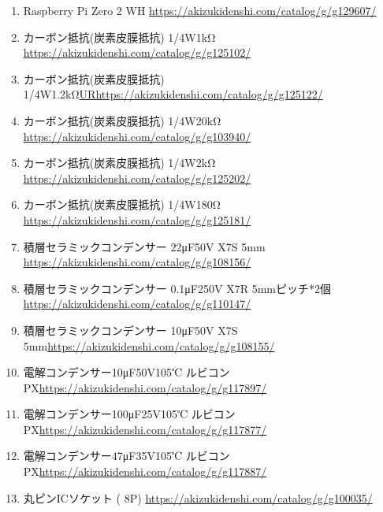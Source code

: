 \documentclass[a4paper,10pt]{jarticle}
\begin{document}
\begin{enumerate}
    \item Raspberry Pi Zero 2 WH \url{https://akizukidenshi.com/catalog/g/g129607/}
    \item カーボン抵抗(炭素皮膜抵抗) 1/4W1kΩ \url{https://akizukidenshi.com/catalog/g/g125102/}
    \item カーボン抵抗(炭素皮膜抵抗) 1/4W1.2kΩ\url{URhttps://akizukidenshi.com/catalog/g/g125122/}
    \item カーボン抵抗(炭素皮膜抵抗) 1/4W20kΩ \url{https://akizukidenshi.com/catalog/g/g103940/}
    \item カーボン抵抗(炭素皮膜抵抗) 1/4W2kΩ \url{https://akizukidenshi.com/catalog/g/g125202/}
    \item カーボン抵抗(炭素皮膜抵抗) 1/4W180Ω \url{https://akizukidenshi.com/catalog/g/g125181/}
    \item 積層セラミックコンデンサー 22μF50V X7S 5mm \url{https://akizukidenshi.com/catalog/g/g108156/}
    \item 積層セラミックコンデンサー 0.1μF250V X7R 5mmピッチ*2個\url{https://akizukidenshi.com/catalog/g/g110147/}
    \item 積層セラミックコンデンサー 10μF50V X7S 5mm\url{https://akizukidenshi.com/catalog/g/g108155/}
    \item 電解コンデンサー10μF50V105℃ ルビコンPX\url{https://akizukidenshi.com/catalog/g/g117897/}
    \item 電解コンデンサー100μF25V105℃ ルビコンPX\url{https://akizukidenshi.com/catalog/g/g117877/}
    \item 電解コンデンサー47μF35V105℃ ルビコンPX\url{https://akizukidenshi.com/catalog/g/g117887/}
    \item 丸ピンICソケット ( 8P) \url{https://akizukidenshi.com/catalog/g/g100035/}

\end{enumerate}
\end{document}

